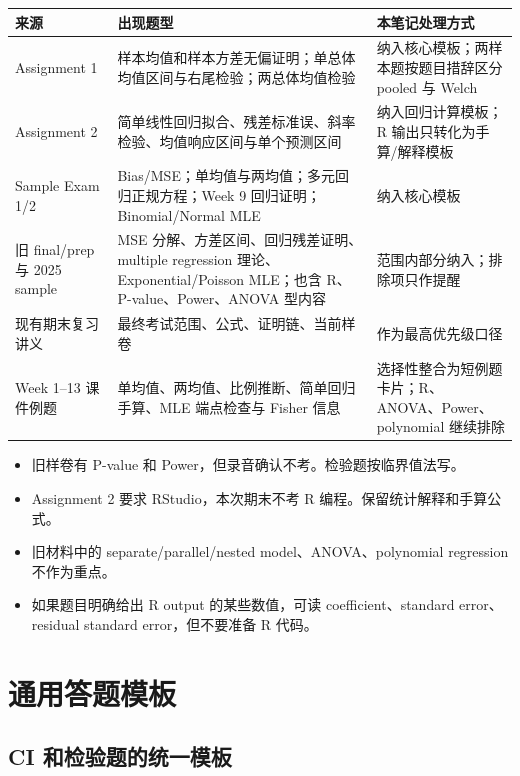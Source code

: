 \documentclass[11pt,a4paper]{article}
\begin{document}
\begin{longtable}{p{}p{}p{}}
\toprule
来源 & 出现题型 & 本笔记处理方式\\
\midrule
Assignment 1 & 样本均值和样本方差无偏证明；单总体均值区间与右尾检验；两总体均值检验 & 纳入核心模板；两样本题按题目措辞区分 pooled 与 Welch\\
Assignment 2 & 简单线性回归拟合、残差标准误、斜率检验、均值响应区间与单个预测区间 & 纳入回归计算模板；R 输出只转化为手算/解释模板\\
Sample Exam 1/2 & Bias/MSE；单均值与两均值；多元回归正规方程；Week 9 回归证明；Binomial/Normal MLE & 纳入核心模板\\
旧 final/prep 与 2025 sample & MSE 分解、方差区间、回归残差证明、multiple regression 理论、Exponential/Poisson MLE；也含 R、P-value、Power、ANOVA 型内容 & 范围内部分纳入；排除项只作提醒\\
现有期末复习讲义 & 最终考试范围、公式、证明链、当前样卷 & 作为最高优先级口径\\
Week 1--13 课件例题 & 单均值、两均值、比例推断、简单回归手算、MLE 端点检查与 Fisher 信息 & 选择性整合为短例题卡片；R、ANOVA、Power、polynomial 继续排除\\
\bottomrule
\end{longtable}

\begin{warnbox}[旧材料中容易误带入期末的内容]
\begin{itemize}
  \item 旧样卷有 P-value 和 Power，但录音确认不考。检验题按临界值法写。
  \item Assignment 2 要求 RStudio，本次期末不考 R 编程。保留统计解释和手算公式。
  \item 旧材料中的 separate/parallel/nested model、ANOVA、polynomial regression 不作为重点。
  \item 如果题目明确给出 R output 的某些数值，可读 coefficient、standard error、residual standard error，但不要准备 R 代码。
\end{itemize}
\end{warnbox}

\section{通用答题模板}

\subsection{CI 和检验题的统一模板}
\end{document}
